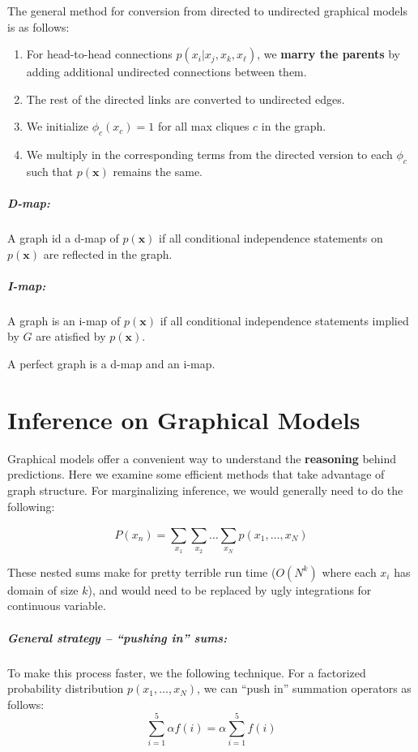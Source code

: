 \documentclass[a4paper,12pt]{report}
\begin{document}
The general method for conversion from directed to undirected graphical models is as follows:
\begin{enumerate}
\item For head-to-head connections $p(x_i | x_j, x_k, x_\ell)$, we \textbf{marry the parents} by adding additional undirected connections between them.
\item The rest of the directed links are converted to undirected edges.
\item We initialize $\phi_c(x_c) = 1$ for all max cliques $c$ in the graph.
\item We multiply in the corresponding terms from the directed version to each $\phi_c$ such that $p(\pmb x)$ remains the same.
\end{enumerate}


\paragraph{D-map: } A graph id a d-map of $p(\pmb x)$ if all conditional independence statements on $p(\pmb x)$ are reflected in the graph.
\paragraph{I-map: } A graph is an i-map of $p(\pmb x)$ if all conditional independence statements implied by $G$ are atisfied by $p(\pmb x)$.


A perfect graph is a d-map and an i-map.



\chapter{Inference on Graphical Models}

Graphical models offer a convenient way to understand the \textbf{reasoning} behind predictions. Here we examine some efficient methods that take advantage of graph structure. For marginalizing inference, we would generally need to do the following:

\begin{equation}
P(x_n) = \sum_{x_1}^{} \sum_{x_2}^{} \dots \sum_{x_N}^{} p(x_1, \dots, x_N)
\end{equation}

These nested sums make for pretty terrible run time ($O(N^k)$ where each $x_i$ has domain of size $k$), and would need to be replaced by ugly integrations for continuous variable.

\paragraph{General strategy -- ``pushing in'' sums: } To make this process faster, we the following technique. For a factorized probability distribution $p(x_1, \dots, x_N)$, we can ``push in'' summation operators as follows:
\begin{equation}
\sum_{i=1}^{5} \alpha f(i) = \alpha \sum_{i=1}^{5} f(i)
\end{equation}
\end{document}
